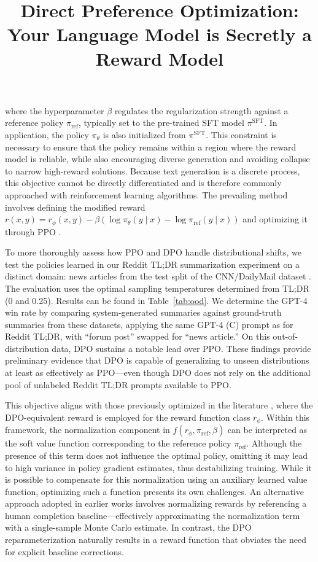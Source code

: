 \title{Direct Preference Optimization: Your Language Model is Secretly a Reward Model}
where the hyperparameter $\beta$ regulates the regularization strength against a reference policy $\pi_\text{ref}$, typically set to the pre-trained SFT model $\pi^\text{SFT}$. In application, the policy $\pi_\theta$ is also initialized from $\pi^\text{SFT}$. This constraint is necessary to ensure that the policy remains within a region where the reward model is reliable, while also encouraging diverse generation and avoiding collapse to narrow high-reward solutions. Because text generation is a discrete process, this objective cannot be directly differentiated and is therefore commonly approached with reinforcement learning algorithms. The prevailing method \citep{ziegler2020finetuning, stiennon2022learning, bai2022training, ouyang2022training} involves defining the modified reward $r(x, y) = r_{\phi}(x, y) -\beta (\log \pi_{\theta}(y\mid x) - \log \pi_\text{ref}(y\mid x))$ and optimizing it through PPO \cite{schulman2017proximal}. 

To more thoroughly assess how PPO and DPO handle distributional shifts, we test the policies learned in our Reddit TL;DR summarization experiment on a distinct domain: news articles from the test split of the CNN/DailyMail dataset \citep{nallapati-etal-2016-abstractive}. The evaluation uses the optimal sampling temperatures determined from TL;DR (0 and 0.25). Results can be found in Table~\ref{tab:ood}. We determine the GPT-4 win rate by comparing system-generated summaries against ground-truth summaries from these datasets, applying the same GPT-4 (C) prompt as for Reddit TL;DR, with “forum post” swapped for “news article.” On this out-of-distribution data, DPO sustains a notable lead over PPO. These findings provide preliminary evidence that DPO is capable of generalizing to unseen distributions at least as effectively as PPO—even though DPO does not rely on the additional pool of unlabeled Reddit TL;DR prompts available to PPO.

This objective aligns with those previously optimized in the literature \citep{ziegler2020finetuning, stiennon2022learning, bai2022training, ouyang2022training}, where the DPO-equivalent reward is employed for the reward function class $r_{\phi}$. Within this framework, the normalization component in $f(r_{\phi}, \pi_\text{ref}, \beta)$ can be interpreted as the soft value function corresponding to the reference policy $\pi_\text{ref}$. Although the presence of this term does not influence the optimal policy, omitting it may lead to high variance in policy gradient estimates, thus destabilizing training. While it is possible to compensate for this normalization using an auxiliary learned value function, optimizing such a function presents its own challenges. An alternative approach adopted in earlier works involves normalizing rewards by referencing a human completion baseline—effectively approximating the normalization term with a single-sample Monte Carlo estimate. In contrast, the DPO reparameterization naturally results in a reward function that obviates the need for explicit baseline corrections.

